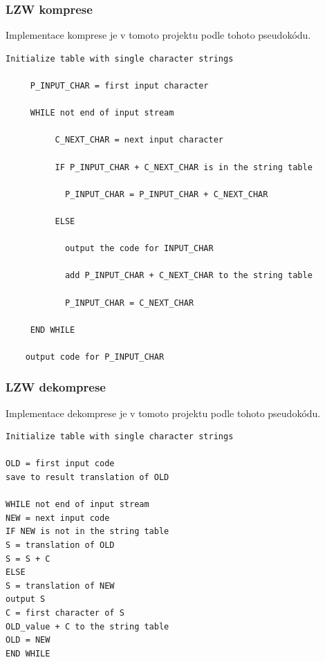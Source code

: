 \documentclass[12pt]{report}
\begin{document}
    \subsubsection{LZW komprese}
Implementace komprese je v tomoto projektu podle tohoto pseudokódu.
\begin{samepage}
    \begin{mdframed}
        \begin{verbatim}
Initialize table with single character strings

     P_INPUT_CHAR = first input character
     
     WHILE not end of input stream
     
          C_NEXT_CHAR = next input character
         
          IF P_INPUT_CHAR + C_NEXT_CHAR is in the string table
          
            P_INPUT_CHAR = P_INPUT_CHAR + C_NEXT_CHAR
            
          ELSE
          
            output the code for INPUT_CHAR
            
            add P_INPUT_CHAR + C_NEXT_CHAR to the string table
          
            P_INPUT_CHAR = C_NEXT_CHAR
          
     END WHILE
     
    output code for P_INPUT_CHAR
        \end{verbatim}
    \end{mdframed}
    \end{samepage}
    

    \subsubsection{LZW dekomprese}
    Implementace dekomprese je v tomoto projektu podle tohoto pseudokódu.
    \begin{samepage}
    \begin{mdframed}
        \begin{verbatim}
Initialize table with single character strings

OLD = first input code
save to result translation of OLD

WHILE not end of input stream
NEW = next input code
IF NEW is not in the string table
S = translation of OLD
S = S + C
ELSE
S = translation of NEW
output S
C = first character of S
OLD_value + C to the string table
OLD = NEW
END WHILE
        \end{verbatim}
    \end{mdframed}
    \end{samepage}
\end{document}
